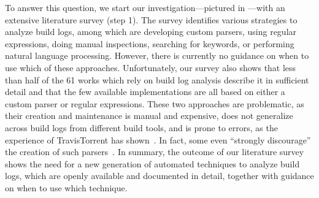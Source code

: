 To answer this question, we start our investigation---pictured in
---with an
extensive literature survey (step 1).
The survey identifies various strategies to
analyze build logs, among which are developing
custom parsers, using regular expressions, doing manual inspections,
searching for keywords, or performing natural language processing.
However, there is currently no guidance on when to use which of these
approaches.
Unfortunately, our survey also shows that
less than half of the 61 works which rely on build log analysis
describe it in sufficient detail and that
the few available implementations are all based on either a custom parser
or regular expressions.
These two approaches are problematic, as their creation
and maintenance is manual and expensive, does not generalize across build
logs from different build tools, and is prone to errors,
as the experience of
TravisTorrent has shown~\cite{beller2017travistorrent,travistorrentquestions}.
In fact, some even ``strongly discourage'' the creation of such
parsers~\cite{urli2018design}.
In summary, the outcome of our literature survey shows the need for a new
generation of automated techniques to analyze build logs, which are
openly available and documented in detail, together with
guidance on when to use which technique.





